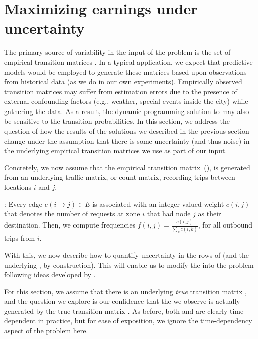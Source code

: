 

\section{Maximizing earnings under uncertainty}
\label{sec:sensitivity}
The primary source of variability in the input of the {\originalproblem} problem
is the set of empirical transition matrices {\empiricaltransitionmatrix}.  In a typical application,
we expect that predictive models would be employed to generate these matrices based upon observations
from historical data (as we do in our own experiments).  Empirically observed transition matrices may 
suffer from estimation errors due to the presence of external confounding factors (e.g., 
weather, special 
events inside the city) while gathering the data. As a result, the dynamic programming solution 
to {\originalproblem}  may also be sensitive to the transition probabilities. In this section, 
we address the question of how the results of the solutions we described in the previous section change 
under the assumption that there is some uncertainty (and thus noise) in the underlying empirical transition 
matrices we use as part of our input.

Concretely, we now assume that the empirical transition matrix~(\empiricaltransitionmatrix),  is generated from an 
underlying traffic matrix, or count matrix, recording trips between locations $i$ and $j$.

:
Every edge $e(i\rightarrow j) \in E$ is associated with an
integer-valued weight $c(i,j)$ that denotes the number of requests
at zone $i$ that had node $j$ as their destination.
Then, we compute frequencies $f(i,j) = \frac{c(i,j)}{\sum_k c(i,k)}$, for all outbound trips from $i$.

With this, we now describe how to quantify uncertainty in the rows of {\empiricaltransitionmatrix} 
(and the underlying {\countmatrix}, by construction). This will enable us to  
modify the {\originalproblem} into the {\robustproblem} problem following ideas developed
by \citet{nilim2004robustness}.



For this section, we assume that there is an underlying \emph{true} transition matrix
{\truetransitionmatrix}, and the question we explore is 
our confidence that the
{\countmatrix} we observe is actually 
generated by the true transition matrix {\truetransitionmatrix}.  As before, both 
{\truetransitionmatrix} and {\countmatrix} are clearly time-dependent in practice,
but for ease of exposition, we ignore the time-dependency aspect of the problem here.

